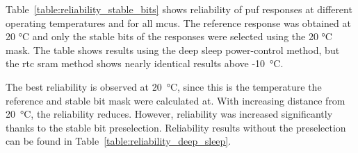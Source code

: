 Table~\ref{table:reliability_stable_bits} shows reliability of \gls{puf} responses at different operating temperatures and for all \glspl{mcu}. The reference response was obtained at 20 °C and only the stable bits of the responses were selected using the 20 °C mask. The table shows results using the deep sleep power-control method, but the \gls{rtc} \gls{sram} method shows nearly identical results above -10~°C.

The best reliability is observed at 20~°C, since this is the temperature the reference and stable bit mask were calculated at. With increasing distance from 20~°C, the reliability reduces. However, reliability was increased significantly thanks to the stable bit preselection. Reliability results without the preselection can be found in Table~\ref{table:reliability_deep_sleep}.

